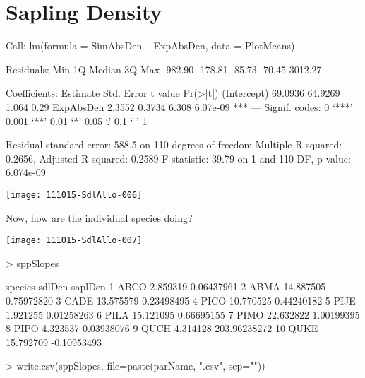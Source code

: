 \documentclass{article}
\begin{document}
\newpage

\section{Sapling Density}
\begin{Schunk}
\begin{Soutput}
Call:
lm(formula = SimAbsDen ~ ExpAbsDen, data = PlotMeans)

Residuals:
    Min      1Q  Median      3Q     Max 
-982.90 -178.81  -85.73  -70.45 3012.27 

Coefficients:
            Estimate Std. Error t value Pr(>|t|)    
(Intercept)  69.0936    64.9269   1.064     0.29    
ExpAbsDen     2.3552     0.3734   6.308 6.07e-09 ***
---
Signif. codes:  0 ‘***’ 0.001 ‘**’ 0.01 ‘*’ 0.05 ‘.’ 0.1 ‘ ’ 1

Residual standard error: 588.5 on 110 degrees of freedom
Multiple R-squared:  0.2656,	Adjusted R-squared:  0.2589 
F-statistic: 39.79 on 1 and 110 DF,  p-value: 6.074e-09
\end{Soutput}
\end{Schunk}
\texttt{[image: 111015-SdlAllo-006]}

Now, how are the individual species doing?

\texttt{[image: 111015-SdlAllo-007]}
\begin{Schunk}
\begin{Sinput}
>   sppSlopes
\end{Sinput}
\begin{Soutput}
   species    sdlDen      saplDen
1     ABCO  2.859319   0.06437961
2     ABMA 14.887505   0.75972820
3     CADE 13.575579   0.23498495
4     PICO 10.770525   0.44240182
5     PIJE  1.921255   0.01258263
6     PILA 15.121095   0.66695155
7     PIMO 22.632822   1.00199395
8     PIPO  4.323537   0.03938076
9     QUCH  4.314128 203.96238272
10    QUKE 15.792709  -0.10953493
\end{Soutput}
\begin{Sinput}
>     write.csv(sppSlopes, file=paste(parName, ".csv", sep=""))
\end{Sinput}
\end{Schunk}


\newpage
\end{document}
